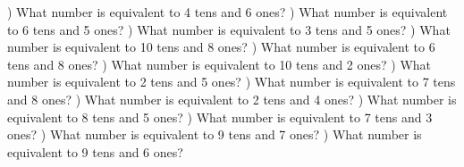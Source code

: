 \documentclass{article}%
\begin{document}
\newline%
) What number is equivalent to 4 tens and 6 ones?%
\newline%
\newline%
) What number is equivalent to 6 tens and 5 ones?%
\newline%
\newline%
) What number is equivalent to 3 tens and 5 ones?%
\newline%
\newline%
) What number is equivalent to 10 tens and 8 ones?%
\newline%
\newline%
) What number is equivalent to 6 tens and 8 ones?%
\newline%
\newline%
) What number is equivalent to 10 tens and 2 ones?%
\newline%
\newline%
) What number is equivalent to 2 tens and 5 ones?%
\newline%
\newline%
) What number is equivalent to 7 tens and 8 ones?%
\newline%
\newline%
) What number is equivalent to 2 tens and 4 ones?%
\newline%
\newline%
) What number is equivalent to 8 tens and 5 ones?%
\newline%
\newline%
) What number is equivalent to 7 tens and 3 ones?%
\newline%
\newline%
) What number is equivalent to 9 tens and 7 ones?%
\newline%
\newline%
) What number is equivalent to 9 tens and 6 ones?%
\newline%
\end{document}
